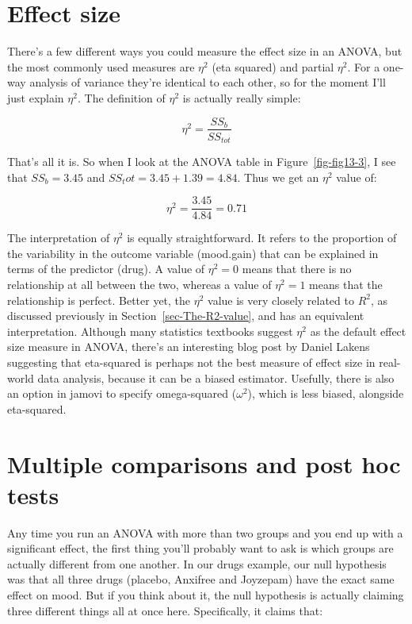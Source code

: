 \documentclass[
  a4paper,
]{book}
\begin{document}
\hypertarget{effect-size}{%
\section{Effect size}\label{effect-size}}

There's a few different ways you could measure the effect size in an
ANOVA, but the most commonly used measures are \(\eta^2\) (eta squared)
and partial \(\eta^2\). For a one-way analysis of variance they're
identical to each other, so for the moment I'll just explain \(\eta^2\).
The definition of \(\eta^2\) is actually really simple:

\[\eta^2=\frac{SS_b}{SS_{tot}}\]

That's all it is. So when I look at the ANOVA table in
Figure~\ref{fig-fig13-3}, I see that \(SS_b = 3.45\) and
\(SS_tot = 3.45 + 1.39 = 4.84\). Thus we get an \(\eta^2\) value of:

\[\eta^2=\frac{3.45}{4.84}=0.71\]

The interpretation of \(\eta^2\) is equally straightforward. It refers
to the proportion of the variability in the outcome variable (mood.gain)
that can be explained in terms of the predictor (drug). A value of
\(\eta^2=0\) means that there is no relationship at all between the two,
whereas a value of \(\eta^2=1\) means that the relationship is perfect.
Better yet, the \(\eta^2\) value is very closely related to \(R^2\), as
discussed previously in Section~\ref{sec-The-R2-value}, and has an
equivalent interpretation. Although many statistics textbooks suggest
\(\eta^2\) as the default effect size measure in ANOVA, there's an
interesting blog post by Daniel Lakens suggesting that eta-squared is
perhaps not the best measure of effect size in real-world data analysis,
because it can be a biased estimator. Usefully, there is also an option
in jamovi to specify omega-squared (\(\omega^2\)), which is less biased,
alongside eta-squared.

\hypertarget{multiple-comparisons-and-post-hoc-tests}{%
\section{Multiple comparisons and post hoc
tests}\label{multiple-comparisons-and-post-hoc-tests}}

Any time you run an ANOVA with more than two groups and you end up with
a significant effect, the first thing you'll probably want to ask is
which groups are actually different from one another. In our drugs
example, our null hypothesis was that all three drugs (placebo, Anxifree
and Joyzepam) have the exact same effect on mood. But if you think about
it, the null hypothesis is actually claiming three different things all
at once here. Specifically, it claims that:
\end{document}
